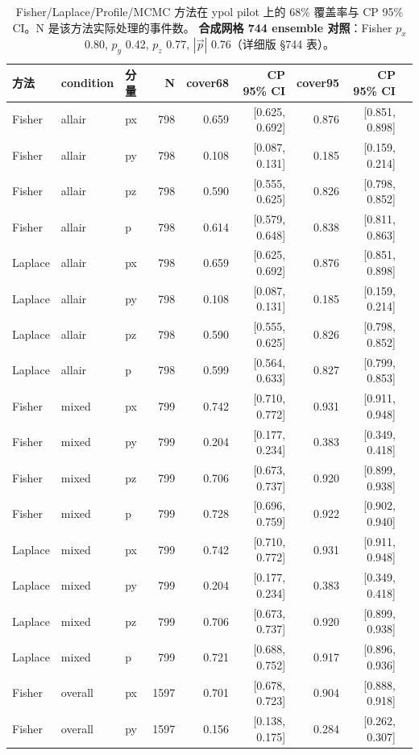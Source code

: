 \documentclass[a4paper,11pt]{article}
\begin{document}
\begin{table}[H]
\centering\footnotesize
\caption{Fisher/Laplace/Profile/MCMC 方法在 ypol pilot 上的 68\% 覆盖率与 CP 95\% CI。N 是该方法实际处理的事件数。
\textbf{合成网格 744 ensemble 对照}：Fisher $p_x$ 0.80, $p_y$ 0.42, $p_z$ 0.77, $|\vec p|$ 0.76（详细版 §744 表）。}
\begin{tabular}{lllrrrrrr}
\toprule
方法 & condition & 分量 & N & cover68 & CP 95\% CI & cover95 & CP 95\% CI \\
\midrule
Fisher & allair & px & 798 & 0.659 & [0.625, 0.692] & 0.876 & [0.851, 0.898] \\
Fisher & allair & py & 798 & 0.108 & [0.087, 0.131] & 0.185 & [0.159, 0.214] \\
Fisher & allair & pz & 798 & 0.590 & [0.555, 0.625] & 0.826 & [0.798, 0.852] \\
Fisher & allair & p & 798 & 0.614 & [0.579, 0.648] & 0.838 & [0.811, 0.863] \\
Laplace & allair & px & 798 & 0.659 & [0.625, 0.692] & 0.876 & [0.851, 0.898] \\
Laplace & allair & py & 798 & 0.108 & [0.087, 0.131] & 0.185 & [0.159, 0.214] \\
Laplace & allair & pz & 798 & 0.590 & [0.555, 0.625] & 0.826 & [0.798, 0.852] \\
Laplace & allair & p & 798 & 0.599 & [0.564, 0.633] & 0.827 & [0.799, 0.853] \\
Fisher & mixed & px & 799 & 0.742 & [0.710, 0.772] & 0.931 & [0.911, 0.948] \\
Fisher & mixed & py & 799 & 0.204 & [0.177, 0.234] & 0.383 & [0.349, 0.418] \\
Fisher & mixed & pz & 799 & 0.706 & [0.673, 0.737] & 0.920 & [0.899, 0.938] \\
Fisher & mixed & p & 799 & 0.728 & [0.696, 0.759] & 0.922 & [0.902, 0.940] \\
Laplace & mixed & px & 799 & 0.742 & [0.710, 0.772] & 0.931 & [0.911, 0.948] \\
Laplace & mixed & py & 799 & 0.204 & [0.177, 0.234] & 0.383 & [0.349, 0.418] \\
Laplace & mixed & pz & 799 & 0.706 & [0.673, 0.737] & 0.920 & [0.899, 0.938] \\
Laplace & mixed & p & 799 & 0.721 & [0.688, 0.752] & 0.917 & [0.896, 0.936] \\
Fisher & overall & px & 1597 & 0.701 & [0.678, 0.723] & 0.904 & [0.888, 0.918] \\
Fisher & overall & py & 1597 & 0.156 & [0.138, 0.175] & 0.284 & [0.262, 0.307] \\

\end{tabular}
\end{table}
\end{document}

